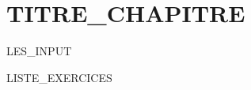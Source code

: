 \documentclass[a4paper,10pt]{book}
\begin{document}


\chapter{TITRE_CHAPITRE}
LES_INPUT

\newpage

\renewcommand{\cite}[1]{}           %

LISTE_EXERCICES
\end{document}
